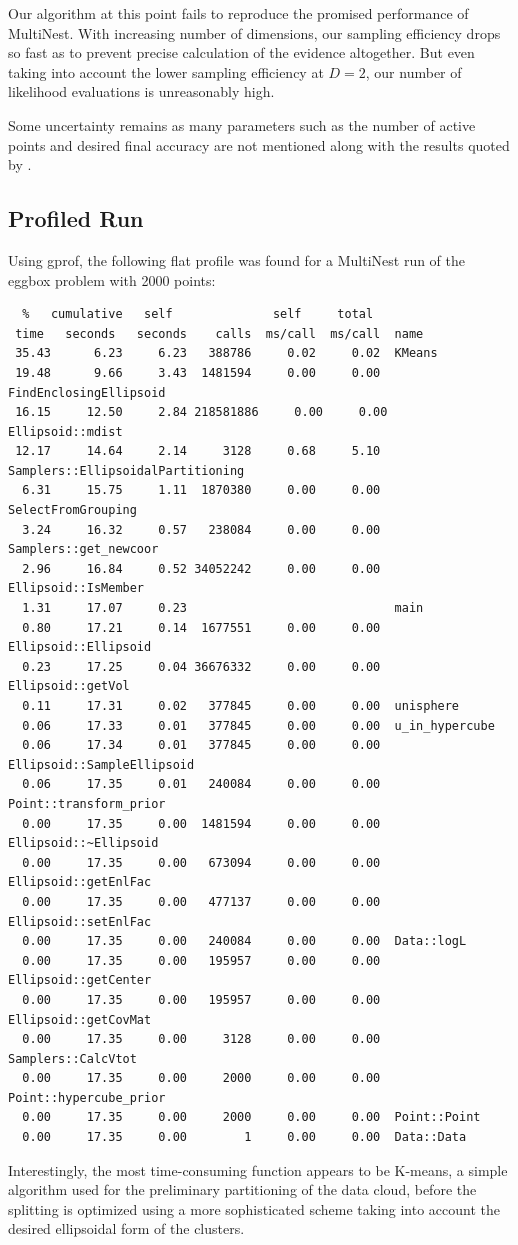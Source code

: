\documentclass{article}
\begin{document}
Our algorithm at this point fails to reproduce the promised performance of MultiNest. With increasing number of dimensions, our sampling efficiency drops so fast as to prevent precise calculation of the evidence altogether. But even taking into account the lower sampling efficiency at $D=2$, our number of likelihood evaluations is unreasonably high.

Some uncertainty remains as many parameters such as the number of active points and desired final accuracy are not mentioned along with the results quoted by \cite{2009MNRAS.398.1601F}.

\subsection{Profiled Run}
Using gprof, the following flat profile was found for a MultiNest run of the eggbox problem with 2000 points:

\begin{verbatim}
  %   cumulative   self              self     total           
 time   seconds   seconds    calls  ms/call  ms/call  name    
 35.43      6.23     6.23   388786     0.02     0.02  KMeans
 19.48      9.66     3.43  1481594     0.00     0.00  FindEnclosingEllipsoid
 16.15     12.50     2.84 218581886     0.00     0.00  Ellipsoid::mdist
 12.17     14.64     2.14     3128     0.68     5.10  Samplers::EllipsoidalPartitioning
  6.31     15.75     1.11  1870380     0.00     0.00  SelectFromGrouping
  3.24     16.32     0.57   238084     0.00     0.00  Samplers::get_newcoor
  2.96     16.84     0.52 34052242     0.00     0.00  Ellipsoid::IsMember
  1.31     17.07     0.23                             main
  0.80     17.21     0.14  1677551     0.00     0.00  Ellipsoid::Ellipsoid
  0.23     17.25     0.04 36676332     0.00     0.00  Ellipsoid::getVol
  0.11     17.31     0.02   377845     0.00     0.00  unisphere
  0.06     17.33     0.01   377845     0.00     0.00  u_in_hypercube
  0.06     17.34     0.01   377845     0.00     0.00  Ellipsoid::SampleEllipsoid
  0.06     17.35     0.01   240084     0.00     0.00  Point::transform_prior
  0.00     17.35     0.00  1481594     0.00     0.00  Ellipsoid::~Ellipsoid
  0.00     17.35     0.00   673094     0.00     0.00  Ellipsoid::getEnlFac
  0.00     17.35     0.00   477137     0.00     0.00  Ellipsoid::setEnlFac
  0.00     17.35     0.00   240084     0.00     0.00  Data::logL
  0.00     17.35     0.00   195957     0.00     0.00  Ellipsoid::getCenter
  0.00     17.35     0.00   195957     0.00     0.00  Ellipsoid::getCovMat
  0.00     17.35     0.00     3128     0.00     0.00  Samplers::CalcVtot
  0.00     17.35     0.00     2000     0.00     0.00  Point::hypercube_prior
  0.00     17.35     0.00     2000     0.00     0.00  Point::Point
  0.00     17.35     0.00        1     0.00     0.00  Data::Data
\end{verbatim}
Interestingly, the most time-consuming function appears to be K-means, a simple algorithm used for the preliminary partitioning of the data cloud, before the splitting is optimized using a more sophisticated scheme taking into account the desired ellipsoidal form of the clusters.
\end{document}
